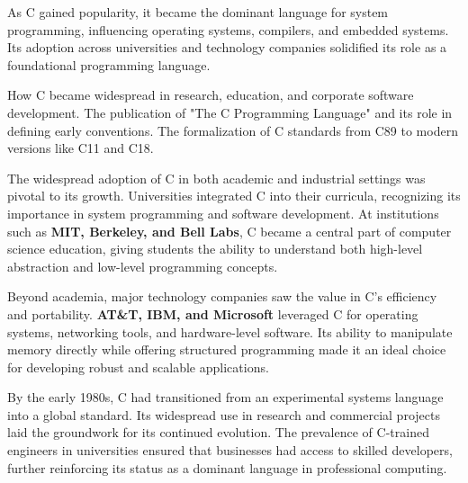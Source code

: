 \begin{NxSSSBox}
	\begin{NxIDBox}
		As C gained popularity, it became the dominant language for system programming, influencing operating systems, compilers, and embedded systems. Its adoption across universities and technology companies solidified its role as a foundational programming language.
	\end{NxIDBox}
	\begin{NxIDBoxL}
		 How C became widespread in research, education, and corporate software development.
		 The publication of "The C Programming Language" and its role in defining early conventions.
		 The formalization of C standards from C89 to modern versions like C11 and C18.
	\end{NxIDBoxL}
\end{NxSSSBox}

\begin{NxSSSSBox}
	\begin{NxIDBox}
		The widespread adoption of C in both academic and industrial settings was pivotal to its growth. Universities integrated C into their curricula, recognizing its importance in system programming and software development. At institutions such as \textbf{MIT, Berkeley, and Bell Labs}, C became a central part of computer science education, giving students the ability to understand both high-level abstraction and low-level programming concepts.
	\end{NxIDBox}
	\begin{NxIDBox}
		Beyond academia, major technology companies saw the value in C’s efficiency and portability. \textbf{AT\&T, IBM, and Microsoft} leveraged C for operating systems, networking tools, and hardware-level software. Its ability to manipulate memory directly while offering structured programming made it an ideal choice for developing robust and scalable applications.
	\end{NxIDBox}
	\begin{NxIDBox}
		By the early 1980s, C had transitioned from an experimental systems language into a global standard. Its widespread use in research and commercial projects laid the groundwork for its continued evolution. The prevalence of C-trained engineers in universities ensured that businesses had access to skilled developers, further reinforcing its status as a dominant language in professional computing.
	\end{NxIDBox}
\end{NxSSSSBox}

